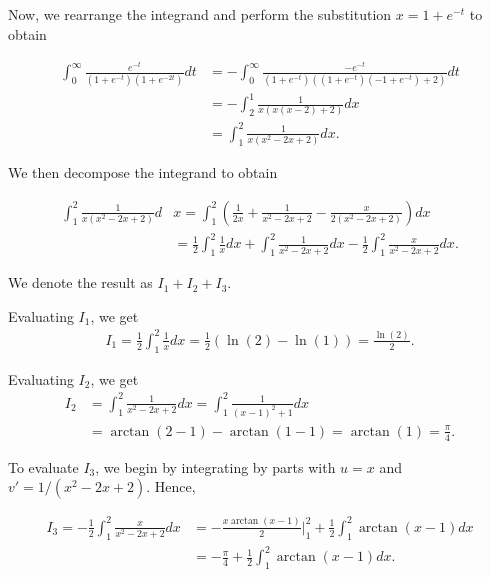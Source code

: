 \documentclass{article}
\begin{document}
\vspace{5mm}

Now, we rearrange the integrand and perform the substitution $x=1+e^{-t}$ to obtain

\begin{align*}
    \int_{0}^{\infty}\frac{e^{-t}}{(1+e^{-t})(1+e^{-2t})}dt &= -\int_{0}^{\infty}\frac{-e^{-t}}{(1+e^{-t})((1+e^{-t})(-1+e^{-t})+2)}dt \\ 
    &=-\int_{2}^{1}\frac{1}{x(x(x-2)+2)}dx \\
    &= \int_{1}^{2}\frac{1}{x(x^2-2x+2)}dx.
\end{align*}

We then decompose the integrand to obtain 

\begin{align*}
     \int_{1}^{2}\frac{1}{x(x^2-2x+2)}d&x = \int_{1}^{2}\left(\frac{1}{2x}+\frac{1}{x^2-2x+2}-\frac{x}{2(x^2-2x+2)}\right)dx \\
     &=\frac{1}{2}\int_{1}^{2}\frac{1}{x}dx+\int_{1}^{2}\frac{1}{x^2-2x+2}dx-\frac{1}{2}\int_{1}^{2}\frac{x}{x^2-2x+2}dx.
\end{align*}

\vspace{5mm}

We denote the result as $I_1+I_2+I_3$.

\vspace{5mm}

Evaluating $I_1$, we get
\begin{align*}
    I_1=\frac{1}{2}\int_{1}^{2}\frac{1}{x}dx=\frac{1}{2}(\ln(2)-\ln(1))=\frac{\ln(2)}{2}.
\end{align*}

Evaluating $I_2$, we get 
\begin{align*}
    I_2&=\int_{1}^{2}\frac{1}{x^2-2x+2}dx = \int_{1}^{2}\frac{1}{(x-1)^2+1}dx \\
     &=\arctan(2-1)-\arctan(1-1) = \arctan(1)=\frac{\pi}{4}.
\end{align*}

To evaluate $I_3$, we begin by integrating by parts with $u=x$ and \newline $v'={1}/({x^2-2x+2})$. Hence, 

\begin{align*}
    I_3=-\frac{1}{2}\int_{1}^{2}\frac{x}{x^2-2x+2}dx&=-\frac{x\arctan(x-1)}{2}\Big|_{1}^{2}+\frac{1}{2}\int_{1}^{2}\arctan(x-1)dx \\
     &= -\frac{\pi}{4}+\frac{1}{2}\int_{1}^{2}\arctan(x-1)dx.
\end{align*}
\end{document}

